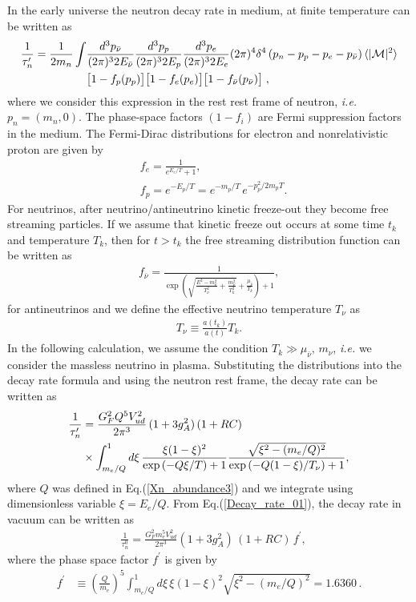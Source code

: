 In the early universe the neutron decay rate in medium, at finite temperature can be written as~\cite{Kuznetsova:2010pi}
\begin{align}
\frac{1}{\tau^\prime_n}=\frac{1}{2m_n}\int&\frac{d^3p_{\bar{\nu}}}{(2\pi)^32E_{\bar{\nu}}}\frac{d^3p_p}{(2\pi)^32E_p}\frac{d^3p_e}{(2\pi)^32E_e}(2\pi)^4\delta^4\left(p_n-p_p-p_e-p_{\bar{\nu}}\right)\langle|\mathcal{M}|^2\rangle\notag\\
&\big[1-f_p(p_p)\big]\big[1-f_e(p_e)\big]\big[1-f_{\bar{\nu}}(p_{\bar{\nu}})\big]\;,
\end{align}
where we consider this expression in the rest rest frame of neutron, {\it i.e.\/} $p_n=(m_n,0)$. The phase-space factors $(1-f_i)$ are Fermi suppression factors in the medium. The Fermi-Dirac distributions for electron and nonrelativistic proton are given by
\begin{align}
&f_e=\frac{1}{e^{E_e/T}+1},\\
&f_p=e^{-E_p/T}=e^{-m_p/T}\,e^{-p_p^2/2m_pT}.
\end{align}
For neutrinos, after neutrino/antineutrino kinetic freeze-out they become free streaming particles. If we assume that kinetic freeze out occurs at some time $t_k$ and temperature $T_k$, then for $t>t_k$ the free streaming distribution function can be written as~\cite{Birrell:2012gg}
\begin{align}
f_{\bar{\nu}}=\frac{1}{\exp{\left(\sqrt{\frac{E^2-m_\nu^2}{T_\nu^2}+\frac{m^2_\nu}{T^2_k}}+\frac{\mu_{\bar{\nu}}}{T_k}\right)+1}},
\end{align}
for antineutrinos and we define the effective neutrino temperature $T_\nu$ as
\begin{align}
T_\nu\equiv\frac{a(t_k)}{a(t)}T_k.
\end{align}
In the following calculation, we assume the condition $T_k\gg\mu_{\bar{\nu}},\,m_\nu$, {\it i.e.\/} we consider the massless neutrino in plasma. Substituting the distributions into the decay rate formula and using the neutron rest frame, the decay rate can be written as 
\begin{align}
\label{Decay_rate_01}
\frac{1}{\tau_n^\prime}&=\frac{G^2_FQ^5V^2_{ud}}{2\pi^3}\,(1+3g^2_A)\,(1+RC)\\
&\times\int^1_{m_e/Q}d\xi\,\frac{\xi(1-\xi)^2}{\exp\left(-Q\xi/{T}\right)+1}\frac{\sqrt{\xi^2-(m_e/Q)^2}}{\exp\left(-Q(1-\xi)/T_\nu\right)+1},\notag
\end{align} 
where $Q$ was defined in Eq.\;(\ref{Xn_abundance3}) and we integrate using dimensionless variable $\xi=E_e/Q$. From Eq.(\ref{Decay_rate_01}), the decay rate in vacuum can be written as
\begin{align}
&\frac{1}{\tau_n^0}=\frac{G^2_Fm_e^5V^2_{ud}}{2\pi^3}(1+3g^2_A)\,(1+RC)\,f^\prime,
\end{align}
where the phase space factor $f^\prime$ is given by
\begin{align}
f^\prime&\equiv\left(\frac{Q}{m_e}\right)^5\int^1_{m_e/Q}d\xi\,{\xi(1-\xi)^2}\sqrt{\xi^2-(m_e/Q)^2}=1.6360\,.
\end{align}

